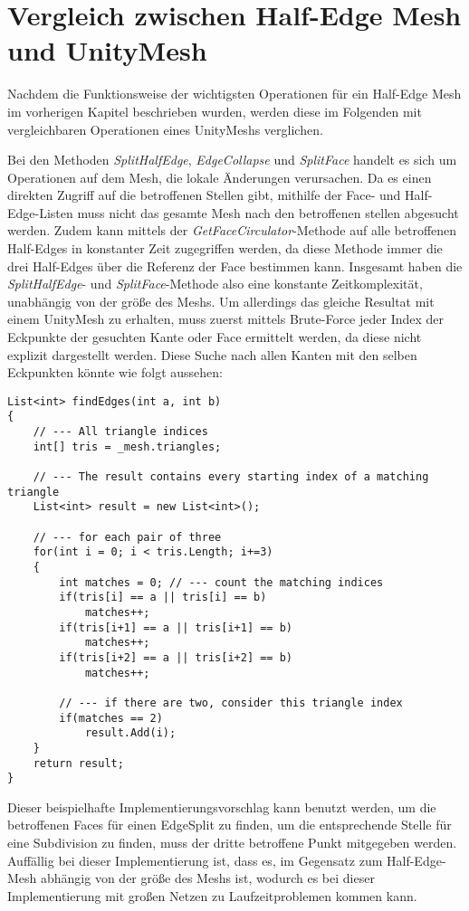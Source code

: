 \section{Vergleich zwischen Half-Edge Mesh und UnityMesh}
Nachdem die Funktionsweise der wichtigsten Operationen f\"ur ein Half-Edge Mesh im vorherigen Kapitel beschrieben wurden, werden diese im Folgenden mit vergleichbaren Operationen eines UnityMeshs verglichen.

Bei den Methoden \textit{SplitHalfEdge}, \textit{EdgeCollapse} und \textit{SplitFace} handelt es sich um Operationen auf dem Mesh, die lokale \"Anderungen verursachen. Da es einen direkten Zugriff auf die betroffenen Stellen gibt, mithilfe der Face- und Half-Edge-Listen muss nicht das gesamte Mesh nach den betroffenen stellen abgesucht werden. Zudem kann mittels der \textit{GetFaceCirculator}-Methode auf alle betroffenen Half-Edges in konstanter Zeit zugegriffen werden, da diese Methode immer die drei Half-Edges \"uber die Referenz der Face bestimmen kann. Insgesamt haben die \textit{SplitHalfEdge}- und \textit{SplitFace}-Methode also eine konstante Zeitkomplexit\"at, unabh\"angig von der gr\"o{\ss}e des Meshs.
Um allerdings das gleiche Resultat mit einem UnityMesh zu erhalten, muss zuerst mittels Brute-Force jeder Index der Eckpunkte der gesuchten Kante oder Face ermittelt werden, da diese nicht explizit dargestellt werden. Diese Suche nach allen Kanten mit den selben Eckpunkten k\"onnte wie folgt aussehen:
\begin{lstlisting}
List<int> findEdges(int a, int b)
{
	// --- All triangle indices
	int[] tris = _mesh.triangles;
	
	// --- The result contains every starting index of a matching triangle
	List<int> result = new List<int>();
	
	// --- for each pair of three
	for(int i = 0; i < tris.Length; i+=3)
	{
		int matches = 0; // --- count the matching indices
		if(tris[i] == a || tris[i] == b)
			matches++;
		if(tris[i+1] == a || tris[i+1] == b)
			matches++;
		if(tris[i+2] == a || tris[i+2] == b)
			matches++;
			
		// --- if there are two, consider this triangle index
		if(matches == 2) 
			result.Add(i);
	}
	return result;
}
\end{lstlisting}
Dieser beispielhafte Implementierungsvorschlag kann benutzt werden, um die betroffenen Faces f\"ur einen EdgeSplit zu finden, um die entsprechende Stelle f\"ur eine Subdivision zu finden, muss der dritte betroffene Punkt mitgegeben werden. Auff\"allig bei dieser Implementierung ist, dass es, im Gegensatz zum Half-Edge-Mesh abh\"angig von der gr\"o{\ss}e des Meshs ist, wodurch es bei dieser Implementierung mit gro{\ss}en Netzen zu Laufzeitproblemen kommen kann.

